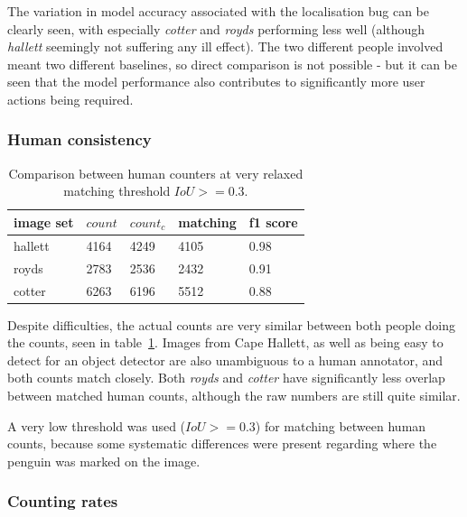 The variation in model accuracy associated with the localisation bug can be clearly seen, with especially \emph{cotter} and \emph{royds} performing less well (although \emph{hallett} seemingly not suffering any ill effect). The two different people involved meant two different baselines, so direct comparison is not possible - but it can be seen that the model performance also contributes to significantly more user actions being required.


\subsubsection{Human consistency}

\begin{table}[h!]
    \centering
\caption{Comparison between human counters at very relaxed matching threshold $IoU >= 0.3$.}    
\begin{tabular}{lllll}
image set & $count$ & $count_c$ & matching & f1 score \\
\toprule
hallett   & 4164      & 4249      & 4105     & 0.98     \\
royds     & 2783      & 2536      & 2432     & 0.91     \\
cotter    & 6263      & 6196      & 5512     & 0.88 \\
\bottomrule
\end{tabular}
\label{tab:human_comparison} 
\end{table}
 
Despite difficulties, the actual counts are very similar between both people doing the counts, seen in table~\ref{tab:human_comparison}. Images from Cape Hallett, as well as being easy to detect for an object detector are also unambiguous to a human annotator, and both counts match closely. Both \emph{royds} and \emph{cotter} have significantly less overlap between matched human counts, although the raw numbers are still quite similar.

A very low threshold was used ($IoU >= 0.3$) for matching between human counts, because some systematic differences were present regarding where the penguin was marked on the image.

\subsubsection {Counting rates}

